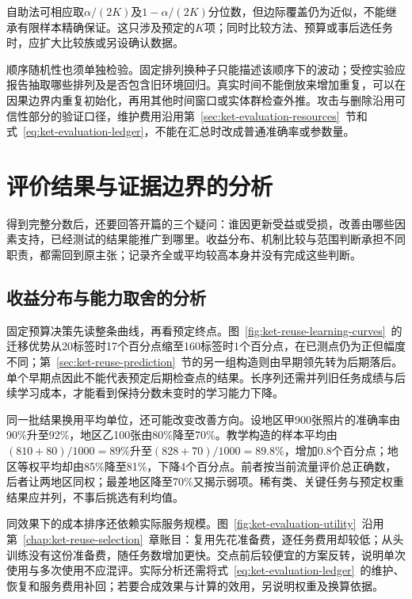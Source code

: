 自助法可相应取$\alpha/(2K)$及$1-\alpha/(2K)$分位数，但边际覆盖仍为近似，不能继承有限样本精确保证。这只涉及预定的$K$项；同时比较方法、预算或事后选任务时，应扩大比较族或另设确认数据。

顺序随机性也须单独检验。固定排列换种子只能描述该顺序下的波动；受控实验应报告抽取哪些排列及是否包含旧环境回归。真实时间不能倒放来增加重复，可以在因果边界内重复初始化，再用其他时间窗口或实体群检查外推。攻击与删除沿用可信性部分的验证口径，维护费用沿用第~\ref{sec:ket-evaluation-resources}~节和式~\eqref{eq:ket-evaluation-ledger}，不能在汇总时改成普通准确率或参数量。

\section{评价结果与证据边界的分析}
\label{sec:ket-evaluation-analysis}

得到完整分数后，还要回答开篇的三个疑问：谁因更新受益或受损，改善由哪些因素支持，已经测试的结果能推广到哪里。收益分布、机制比较与范围判断承担不同职责，都需回到原主张；记录齐全或平均较高本身并没有完成这些判断。

\subsection{收益分布与能力取舍的分析}
\label{sec:ket-evaluation-distribution}

固定预算决策先读整条曲线，再看预定终点。图~\ref{fig:ket-reuse-learning-curves}~的迁移优势从20标签时17个百分点缩至160标签时1个百分点，在已测点仍为正但幅度不同；第~\ref{sec:ket-reuse-prediction}~节的另一组构造则由早期领先转为后期落后。单个早期点因此不能代表预定后期检查点的结果。长序列还需并列旧任务成绩与后续学习成本，才能看到保持分数未变时的学习能力下降。

同一批结果换用平均单位，还可能改变改善方向。设地区甲900张照片的准确率由90\%升至92\%，地区乙100张由80\%降至70\%。教学构造的样本平均由$(810+80)/1000=89\%$升至$(828+70)/1000=89.8\%$，增加0.8个百分点；地区等权平均却由85\%降至81\%，下降4个百分点。前者按当前流量评价总正确数，后者让两地区同权；最差地区降至70\%又揭示弱项。稀有类、关键任务与预定权重结果应并列，不事后挑选有利均值。

同效果下的成本排序还依赖实际服务规模。图~\ref{fig:ket-evaluation-utility}~沿用第~\ref{chap:ket-reuse-selection}~章账目：复用先花准备费，逐任务费用却较低；从头训练没有这份准备费，随任务数增加更快。交点前后较便宜的方案反转，说明单次使用与多次使用不应混评。实际分析还需将式~\eqref{eq:ket-evaluation-ledger}~的维护、恢复和服务费用补回；若要合成效果与计算的效用，另说明权重及换算依据。

